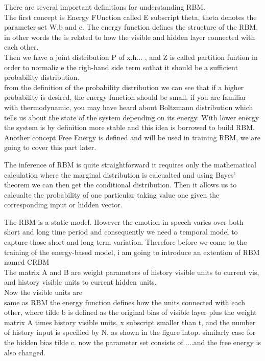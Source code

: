 \begin{frame}

\end{frame}

\begin{frame}
 There are several important definitions for understanding RBM. \\
 The first concept is Energy FUnction called E subscript theta, theta denotes the parameter set W,b and c. The energy function defines the structure of the RBM, in other words the is related to how the visible and hidden layer connected with each other.\\
 Then we have a joint distribution P of x,h... , and Z is called partition funtion in order to normaliz e the righ-hand side term sothat it should be a sufficient probability distribution. \\
 from  the definition of the probability distribution we can see that if a higher probability is desired, the energy function should be small. if you are familiar with thermodynamic, you may have heard about Boltzmann distribution which tells us about the state of the system depending on its energy. With lower energy the system is by definition more stable and this idea is borrowed to build RBM. \\
 Another concept Free Energy is defined and will be used in training RBM, we are going to cover this part later. 
\end{frame}

\begin{frame}
 The inference of RBM is quite straightforward it requires only the mathematical calculation where the marginal distribution is calcualted and using Bayes' theorem we can then get the conditional distribution. Then it allows us to calcualte the probability of one particular taking value one given the corresponding input or hidden vector. 
\end{frame}

\begin{frame}
 The RBM is a static model. However the emotion in speech varies over both short and long time period and consequently we need a temporal model to capture those short and long term variation. Therefore before we come to the training of the energy-based model, i am going to introduce an extention of RBM named CRBM\\
 
 The matrix A and B are weight parameters of history visible units to current vis, and history visible units to current hidden units. \\
 Now the visible units are \\
 same as RBM the energy function defines how the units connected with each other, where tilde b is defined as the original bias of visible layer plus the weight matrix A times history visible units, x subscript smaller than t, and the number of history input is specified by N, as shown in the figure intop. similarly case for the hidden bias tilde c. now the parameter set consists of ....and the free energy is also changed. 
\end{frame}

